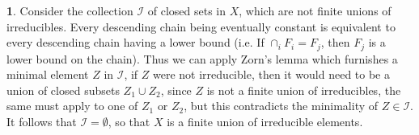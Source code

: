 \documentclass[11pt]{article}
\theoremstyle{definition}
\newtheorem{pb}{}
\newcommand{\tor}[1]{\text{ or }}
\begin{document}
    \begin{pb}
        Consider the collection \(\mathcal{I}\) of closed sets in \(X\), which are not finite unions of irreducibles. Every descending chain being eventually constant is equivalent to every descending chain having a lower bound
        (i.e. If \(\cap_i F_i = F_j\), then \(F_j\) is a lower bound on the chain).
        Thus we can apply Zorn's lemma which furnishes a minimal element \(Z\) in \(\mathcal{I}\), if \(Z\) were not irreducible, then it would need to be a union of closed subsets \(Z_1\cup Z_2\),
        since \(Z\) is not a finite union of irreducibles, the same must apply to one of \(Z_1 \tor ZZ_2\), but this contradicts the minimality of \(Z \in \mathcal{I}\). It follows that
        \(\mathcal{I} = \emptyset\), so that \(X\) is a finite union of irreducible elements.

        
    \end{pb}
\end{document}
